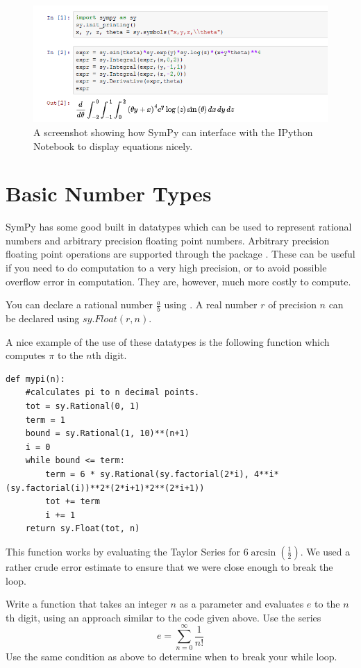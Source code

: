 \begin{figure}
\includegraphics[width=\textwidth]{pretty_printing.png}
\caption{A screenshot showing how SymPy can interface with the IPython Notebook to display equations nicely.}
\label{sympy:pretty_printing}
\end{figure}

\section*{Basic Number Types}
SymPy has some good built in datatypes which can be used to represent rational numbers and arbitrary precision floating point numbers.
Arbitrary precision floating point operations are supported through the package .
These can be useful if you need to do computation to a very high precision, or to avoid possible overflow error in computation.
They are, however, much more costly to compute.

You can declare a rational number $\frac{a}{b}$ using .
A real number $r$ of precision $n$ can be declared using $sy.Float(r,n)$.

A nice example of the use of these datatypes is the following function which computes $\pi$ to the $n$th digit.
\begin{lstlisting}
def mypi(n):
    #calculates pi to n decimal points.
    tot = sy.Rational(0, 1)
    term = 1
    bound = sy.Rational(1, 10)**(n+1)
    i = 0
    while bound <= term:
        term = 6 * sy.Rational(sy.factorial(2*i), 4**i*(sy.factorial(i))**2*(2*i+1)*2**(2*i+1))
        tot += term
        i += 1
    return sy.Float(tot, n)
\end{lstlisting}
This function works by evaluating the Taylor Series for $6\arcsin\left(\frac{1}{2}\right)$.
We used a rather crude error estimate to ensure that we were close enough to break the loop.

\begin{problem}
Write a function  that takes an integer $n$ as a parameter and evaluates $e$ to the $n$th digit, using an approach similar to the code given above.
Use the series 
\begin{equation*}
e=\sum_{n=0}^{\infty} \frac{1}{n!}
\end{equation*}
Use the same condition as above to determine when to break your while loop.
\end{problem}

